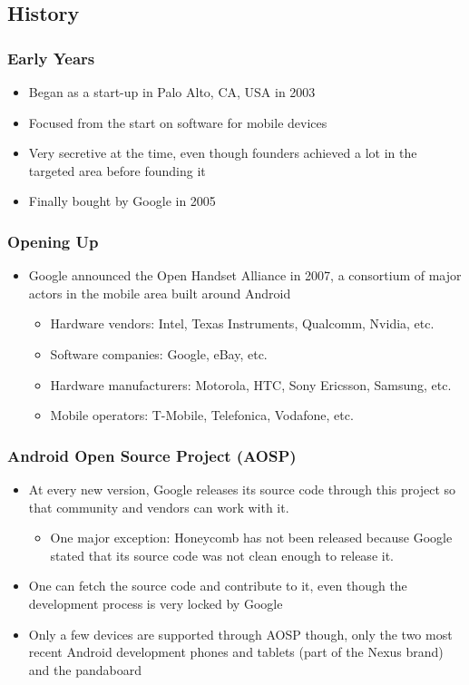 \subsection{History}
\begin{frame}
  \frametitle{Early Years}
  \begin{itemize}
  \item Began as a start-up in Palo Alto, CA, USA in 2003
  \item Focused from the start on software for mobile devices
  \item Very secretive at the time, even though founders achieved a
    lot in the targeted area before founding it
  \item Finally bought by Google in 2005
  \end{itemize}
\end{frame}

\begin{frame}
  \frametitle{Opening Up}
  \begin{itemize}
  \item Google announced the Open Handset Alliance in 2007, a
    consortium of major actors in the mobile area built around Android
    \begin{itemize}
    \item Hardware vendors: Intel, Texas Instruments, Qualcomm,
      Nvidia, etc.
    \item Software companies: Google, eBay, etc.
    \item Hardware manufacturers: Motorola, HTC, Sony Ericsson,
      Samsung, etc.
    \item Mobile operators: T-Mobile, Telefonica, Vodafone, etc.
    \end{itemize}
  \end{itemize}
\end{frame}

\begin{frame}
  \frametitle{Android Open Source Project (AOSP)}
  \begin{itemize}
  \item At every new version, Google releases its source code
    through this project so that community and vendors can
    work with it.
    \begin{itemize}
    \item One major exception: Honeycomb has not been released because
      Google stated that its source code was not clean enough to
      release it.
    \end{itemize}
  \item One can fetch the source code and contribute to it, even though
    the development process is very locked by Google
  \item Only a few devices are supported through AOSP though, only the
    two most recent Android development phones and tablets (part of
    the Nexus brand) and the pandaboard
  \end{itemize}
\end{frame}

